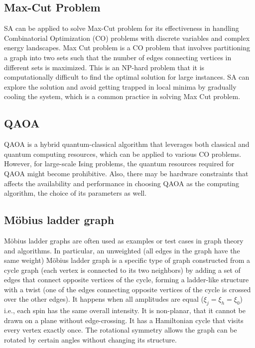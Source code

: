 \subsection{Max-Cut Problem}
SA can be applied to solve Max-Cut problem for its effectiveness in handling Combinatorial Optimization (CO) problems with discrete variables and complex energy landscapes. Max Cut problem is a CO problem that involves partitioning a graph into two sets such that the number of edges connecting vertices in different sets is maximized. This is an NP-hard problem that it is computationally difficult to find the optimal solution for large instances. SA can explore the solution and avoid getting trapped in local minima by gradually cooling the system, which is a common practice in solving Max Cut problem.\\

\subsection{QAOA}
QAOA is a hybrid quantum-classical algorithm that leverages both classical and quantum computing resources, which can be applied to various CO problems. However, for large-scale Ising problems, the quantum resources required for QAOA might become prohibitive. Also, there may be hardware constraints that affects the availability and performance in choosing QAOA as the computing algorithm, the choice of its parameters as well.\\ 

\subsection{Möbius ladder graph}
Möbius ladder graphs are often used as examples or test cases in graph theory and algorithms. In particular, an unweighted (all edges in the graph have the same weight) Möbius ladder graph is a specific type of graph constructed from a cycle graph (each vertex is connected to its two neighbors) by adding a set of edges that connect opposite vertices of the cycle, forming a ladder-like structure with a twist (one of the edges connecting opposite vertices of the cycle is crossed over the other edges). It happens when all amplitudes are equal ($\xi_j = \xi_h = \xi_0$) i.e., each spin has the same overall intensity. It is non-planar, that it cannot be drawn on a plane without edge-crossing. It has a Hamiltonian cycle that visits every vertex exactly once. The rotational symmetry allows the graph can be rotated by certain angles without changing its structure.\\

